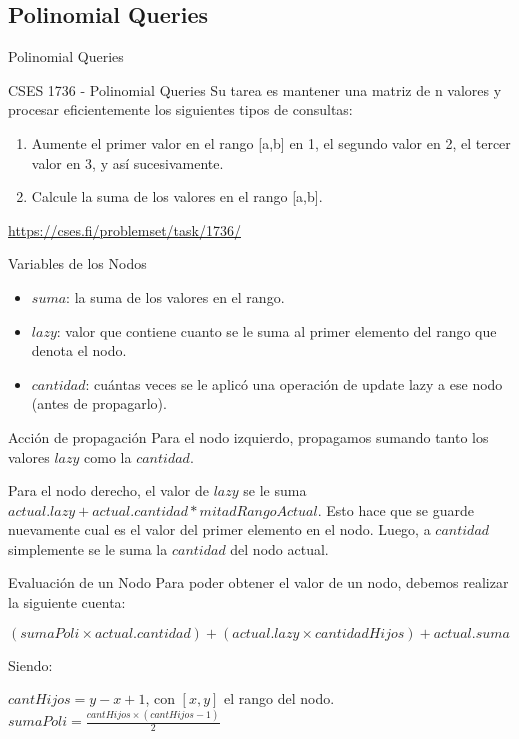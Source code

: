 \documentclass{beamer}
\begin{document}
\subsection{Polinomial Queries}
\begin{frame}{Polinomial Queries}
\begin{block}{CSES 1736 - Polinomial Queries}
Su tarea es mantener una matriz de n valores y procesar eficientemente los siguientes tipos de consultas:
\begin{enumerate}
    \item Aumente el primer valor en el rango [a,b] en 1, el segundo valor en 2, el tercer valor en 3, y así sucesivamente.
    \item Calcule la suma de los valores en el rango [a,b].
\end{enumerate}
\end{block}

\url{https://cses.fi/problemset/task/1736/}
\end{frame}

\begin{frame}{Variables de los Nodos}
\begin{itemize}
    \item $suma$: la suma de los valores en el rango.
    \item $lazy$: valor que contiene cuanto se le suma al primer elemento del rango que denota el nodo.
    \item $cantidad$: cuántas veces se le aplicó una operación de update lazy a ese nodo (antes de propagarlo).
\end{itemize}  
\end{frame}
    
\begin{frame}{Acción de propagación}
Para el nodo izquierdo, propagamos sumando tanto los valores $lazy$ como la $cantidad$.

\pause
Para el nodo derecho, el valor de $lazy$ se le suma $actual.lazy+actual.cantidad * mitadRangoActual$. Esto hace que se guarde nuevamente cual es el valor del primer elemento en el nodo. Luego, a $cantidad$ simplemente se le suma la $cantidad$ del nodo actual.
\end{frame}
    
\begin{frame}{Evaluación de un Nodo}
Para poder obtener el valor de un nodo, debemos realizar la siguiente cuenta:

$(sumaPoli \times actual.cantidad) + (actual.lazy \times cantidadHijos) + actual.suma$

\pause
Siendo:

$cantHijos = y - x + 1$, con $[x,y]$ el rango del nodo.
$sumaPoli = \frac{cantHijos \times (cantHijos-1)}{2}$
\end{frame}
\end{document}

